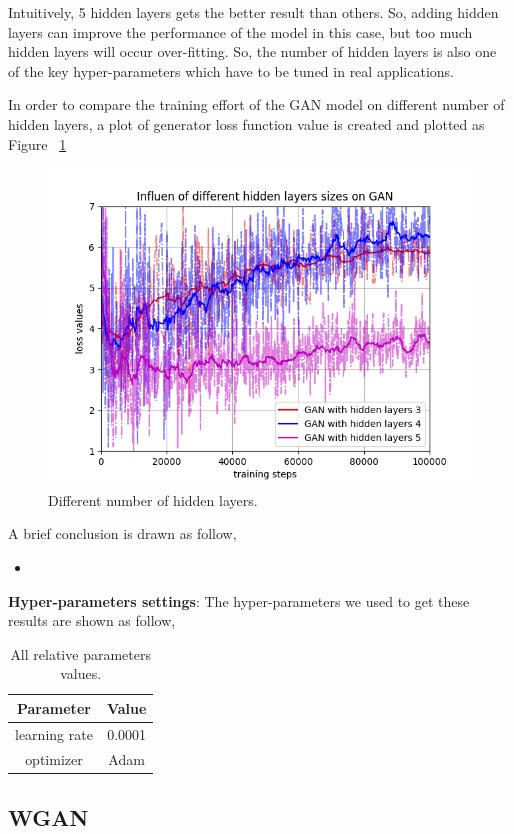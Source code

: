 \documentclass[12pt,letterpaper]{article}
\begin{document}
Intuitively, 5 hidden layers gets the better result than others. So, adding hidden layers can improve the performance of the model in this case, but too much hidden layers will occur over-fitting. So, the number of hidden layers is also one of the key hyper-parameters which have to be tuned in real applications.

In order to compare the training effort of the GAN model on different number of hidden layers, a plot of generator loss function value is created and plotted as Figure ~\ref{fig:gen_hidden}
\begin{figure}[h]
    \centering
    \includegraphics[width=.6\linewidth]{GAN_MNIST_hidden.png}
    \caption{\small Different number of hidden layers.}
    \label{fig:gen_hidden}
\end{figure}



A brief conclusion is drawn as follow,
\begin{itemize}
    \item 
\end{itemize}

\textbf{Hyper-parameters settings}: The hyper-parameters we used to get these results are shown as follow,
\begin{table}[h]
        \centering
        \vspace{\baselineskip}
        \caption{All relative parameters values.}\label{T:parameters}
      \begin{tabular}{cc}
        \hline
        Parameter & Value\\
        \hline
        learning rate & 0.0001\\
        optimizer & Adam\\
        \hline
      \end{tabular}
\end{table}
\subsection{WGAN}
\end{document}
